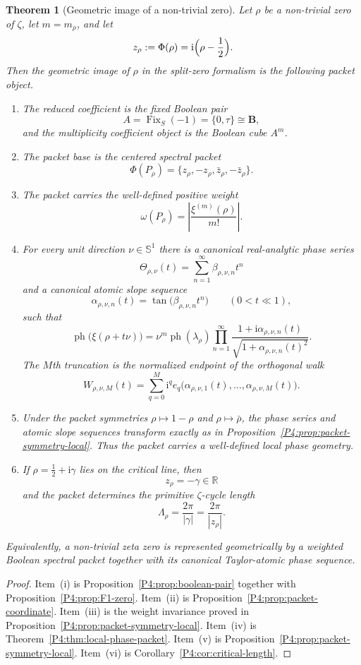 \documentclass[11pt,a4paper]{article}
\numberwithin{equation}{section}
\newtheorem{theorem}{Theorem}[section]
\theoremstyle{definition}
\theoremstyle{remark}
\DeclareMathOperator{\Fix}{Fix}
\newcommand{\RR}{\mathbb R}
\newcommand{\BB}{\mathbf B}
\newcommand{\taup}{\tau}
\newcommand{\Sph}{\mathbb S^1}
\newcommand{\ph}{\operatorname{ph}}
\newcommand{\ii}{\mathrm i}
\begin{document}
\begin{theorem}[Geometric image of a non-trivial zero]\label{P4:thm:final}
Let $\rho$ be a non-trivial zero of $\zeta$, let $m=m_\rho$, and let
\[
z_\rho:=\Phi(\rho)=\ii\Bigl(\rho-\frac12\Bigr).
\]
Then the geometric image of $\rho$ in the split-zero formalism is the following packet object.
\begin{enumerate}[label=(\roman*)]
\item The reduced coefficient is the fixed Boolean pair
\[
A=\Fix_S(-1)=\{0,\taup\}\cong\BB,
\]
and the multiplicity coefficient object is the Boolean cube $A^m$.
\item The packet base is the centered spectral packet
\[
\Phi(P_\rho)=\{z_\rho,-z_\rho,\bar z_\rho,-\bar z_\rho\}.
\]
\item The packet carries the well-defined positive weight
\[
\omega(P_\rho)=\left|\frac{\xi^{(m)}(\rho)}{m!}\right|.
\]
\item For every unit direction $\nu\in\Sph$ there is a canonical real-analytic phase series
\[
\Theta_{\rho,\nu}(t)=\sum_{n=1}^{\infty}\beta_{\rho,\nu,n}t^n
\]
and a canonical atomic slope sequence
\[
\alpha_{\rho,\nu,n}(t)=\tan\bigl(\beta_{\rho,\nu,n}t^n\bigr)
\qquad (0<t\ll1),
\]
such that
\[
\ph\bigl(\xi(\rho+t\nu)\bigr)=\nu^m\ph(\lambda_\rho)
\prod_{n=1}^{\infty}\frac{1+\ii\alpha_{\rho,\nu,n}(t)}{\sqrt{1+\alpha_{\rho,\nu,n}(t)^2}}.
\]
The $M$th truncation is the normalized endpoint of the orthogonal walk
\[
W_{\rho,\nu,M}(t)=\sum_{q=0}^M \ii^q e_q\bigl(\alpha_{\rho,\nu,1}(t),\dots,\alpha_{\rho,\nu,M}(t)\bigr).
\]
\item Under the packet symmetries $\rho\mapsto1-\rho$ and $\rho\mapsto\bar\rho$, the phase series and atomic slope sequences transform exactly as in Proposition~\ref{P4:prop:packet-symmetry-local}.  Thus the packet carries a well-defined local phase geometry.
\item If $\rho=\tfrac12+\ii\gamma$ lies on the critical line, then
\[
z_\rho=-\gamma\in\RR
\]
and the packet determines the primitive $\zeta$-cycle length
\[
\Lambda_\rho=\frac{2\pi}{|\gamma|}=\frac{2\pi}{|z_\rho|}.
\]
\end{enumerate}
Equivalently, a non-trivial zeta zero is represented geometrically by a weighted Boolean spectral packet together with its canonical Taylor-atomic phase sequence.
\end{theorem}

\begin{proof}
Item~(i) is Proposition~\ref{P4:prop:boolean-pair} together with Proposition~\ref{P4:prop:F1-zero}.  Item~(ii) is Proposition~\ref{P4:prop:packet-coordinate}.  Item~(iii) is the weight invariance proved in Proposition~\ref{P4:prop:packet-symmetry-local}.  Item~(iv) is Theorem~\ref{P4:thm:local-phase-packet}.  Item~(v) is Proposition~\ref{P4:prop:packet-symmetry-local}.  Item~(vi) is Corollary~\ref{P4:cor:critical-length}.
\end{proof}
\end{document}
